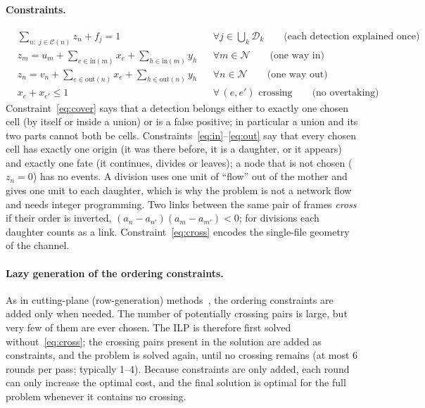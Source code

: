 \documentclass[11pt,a4paper]{article}
\begin{document}
\paragraph{Constraints.}
\begin{align}
&\sum_{n:\;j\in\mathcal C(n)}z_n+f_j=1 && \forall j\in\textstyle\bigcup_k\mathcal D_k \qquad\text{(each detection explained once)}\label{eq:cover}\\
&z_m=u_m+\sum_{e\in\mathrm{in}(m)}x_e+\sum_{h\in\mathrm{in}(m)}y_h && \forall m\in\mathcal N\qquad\text{(one way in)}\label{eq:in}\\
&z_n=v_n+\sum_{e\in\mathrm{out}(n)}x_e+\sum_{h\in\mathrm{out}(n)}y_h && \forall n\in\mathcal N\qquad\text{(one way out)}\label{eq:out}\\
&x_e+x_{e'}\le1 && \forall\,(e,e')\text{ crossing}\qquad\text{(no overtaking)}\label{eq:cross}
\end{align}
Constraint~\eqref{eq:cover} says that a detection belongs either to exactly one chosen cell (by itself or inside a union) or is a false positive; in particular a union and its two parts cannot both be cells. Constraints~\eqref{eq:in}--\eqref{eq:out} say that every chosen cell has exactly one origin (it was there before, it is a daughter, or it appears) and exactly one fate (it continues, divides or leaves); a node that is not chosen ($z_n=0$) has no events. A division uses one unit of ``flow'' out of the mother and gives one unit to each daughter, which is why the problem is not a network flow and needs integer programming. Two links between the same pair of frames \emph{cross} if their order is inverted, $(a_n-a_{n'})(a_m-a_{m'})<0$; for divisions each daughter counts as a link. Constraint~\eqref{eq:cross} encodes the single-file geometry of the channel.

\paragraph{Lazy generation of the ordering constraints.} As in cutting-plane (row-generation) methods~\cite{dantzig1954}, the ordering constraints are added only when needed. The number of potentially crossing pairs is large, but very few of them are ever chosen. The ILP is therefore first solved without~\eqref{eq:cross}; the crossing pairs present in the solution are added as constraints, and the problem is solved again, until no crossing remains (at most 6 rounds per pass; typically 1--4). Because constraints are only added, each round can only increase the optimal cost, and the final solution is optimal for the full problem whenever it contains no crossing.
\end{document}
